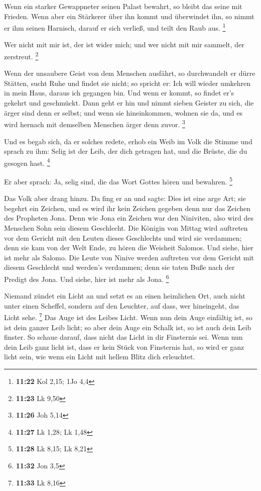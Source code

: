  Wenn ein starker Gewappneter seinen Palast bewahrt, so
bleibt das seine mit Frieden.  Wenn aber ein Stärkerer über
ihn kommt und überwindet ihn, so nimmt er ihm seinen Harnisch, darauf er
sich verließ, und teilt den Raub aus. \footnote{\textbf{11:22} Kol 2,15;
  1Jo 4,4}

 Wer nicht mit mir ist, der ist wider mich; und wer nicht
mit mir sammelt, der zerstreut. \footnote{\textbf{11:23} Lk 9,50}

 Wenn der unsaubere Geist von dem Menschen ausfährt, so
durchwandelt er dürre Stätten, sucht Ruhe und findet sie nicht; so
spricht er: Ich will wieder umkehren in mein Haus, daraus ich gegangen
bin.  Und wenn er kommt, so findet er's gekehrt und
geschmückt.  Dann geht er hin und nimmt sieben Geister zu
sich, die ärger sind denn er selbst; und wenn sie hineinkommen, wohnen
sie da, und es wird hernach mit demselben Menschen ärger denn zuvor.
\footnote{\textbf{11:26} Joh 5,14}

 Und es begab sich, da er solches redete, erhob ein Weib im
Volk die Stimme und sprach zu ihm: Selig ist der Leib, der dich getragen
hat, und die Brüste, die du gesogen hast. \footnote{\textbf{11:27} Lk
  1,28; Lk 1,48}

 Er aber sprach: Ja, selig sind, die das Wort Gottes hören
und bewahren. \footnote{\textbf{11:28} Lk 8,15; Lk 8,21}

 Das Volk aber drang hinzu. Da fing er an und sagte: Dies
ist eine arge Art; sie begehrt ein Zeichen, und es wird ihr kein Zeichen
gegeben denn nur das Zeichen des Propheten Jona.  Denn wie
Jona ein Zeichen war den Niniviten, also wird des Menschen Sohn sein
diesem Geschlecht.  Die Königin von Mittag wird auftreten
vor dem Gericht mit den Leuten dieses Geschlechts und wird sie
verdammen; denn sie kam von der Welt Ende, zu hören die Weisheit
Salomos. Und siehe, hier ist mehr als Salomo.  Die Leute
von Ninive werden auftreten vor dem Gericht mit diesem Geschlecht und
werden's verdammen; denn sie taten Buße nach der Predigt des Jona. Und
siehe, hier ist mehr als Jona. \footnote{\textbf{11:32} Jon 3,5}

 Niemand zündet ein Licht an und setzt es an einen
heimlichen Ort, auch nicht unter einen Scheffel, sondern auf den
Leuchter, auf dass, wer hineingeht, das Licht sehe. \footnote{\textbf{11:33}
  Lk 8,16}  Das Auge ist des Leibes Licht. Wenn nun dein
Auge einfältig ist, so ist dein ganzer Leib licht; so aber dein Auge ein
Schalk ist, so ist auch dein Leib finster.  So schaue
darauf, dass nicht das Licht in dir Finsternis sei.  Wenn
nun dein Leib ganz licht ist, dass er kein Stück von Finsternis hat, so
wird er ganz licht sein, wie wenn ein Licht mit hellem Blitz dich
erleuchtet.

